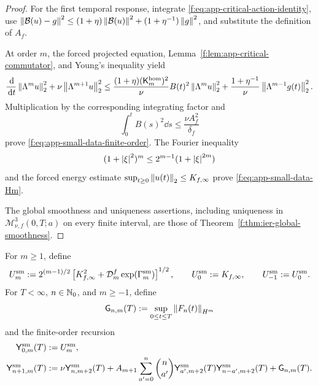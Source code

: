 \begin{proof}
For the first temporal response, integrate
\eqref{f:eq:app-critical-action-identity}, use
\(\left\lVert \mathcal B(u)-g\right\rVert^2\le
(1+\eta)\left\lVert \mathcal B(u)\right\rVert^2
+(1+\eta^{-1})\left\lVert g\right\rVert^2\), and substitute the definition of
\(A_f\).

At order \(m\), the forced projected equation,
Lemma~\ref{f:lem:app-critical-commutator}, and Young's inequality yield
\[
 \frac{\,\mathrm d}{\,\mathrm d t}\left\lVert \Lambda^mu\right\rVert_2^2
 +\nu\left\lVert \Lambda^{m+1}u\right\rVert_2^2
 \le
 \frac{(1+\eta)(\mathsf K_m^{\rm hom})^2}{\nu}
 B(t)^2\left\lVert \Lambda^mu\right\rVert_2^2
 +\frac{1+\eta^{-1}}{\nu}\left\lVert \Lambda^{m-1}g(t)\right\rVert_2^2.
\]
Multiplication by the corresponding integrating factor and
\[
 \int_0^tB(s)^2\dd s\le\frac{\nu A_f^2}{\delta_f}
\]
prove \eqref{f:eq:app-small-data-finite-order}.  The Fourier inequality
\[
 (1+\left|\xi\right|^2)^m\le2^{m-1}(1+\left|\xi\right|^{2m})
\]
and the forced energy estimate
\(\sup_{t\ge0}\left\lVert u(t)\right\rVert_2\le K_{f,\infty}\) prove
\eqref{f:eq:app-small-data-Hm}.

The global smoothness and uniqueness assertions, including uniqueness in
\(\mathscr M_{\nu,f}^3(0,T;a)\) on every finite interval, are those of
Theorem~\ref{f:thm:ier-global-smoothness}.
\end{proof}

For \(m\ge1\), define
\[
 U_m^{\rm sm}
 :=
 2^{(m-1)/2}
 \left[
 K_{f,\infty}^2+
 \mathcal D_m^f\exp(\Gamma_m^{\rm sm})
 \right]^{1/2},
 \qquad
 U_0^{\rm sm}:=K_{f,\infty},
 \qquad
 U_{-1}^{\rm sm}:=U_0^{\rm sm}.
\]
For \(T<\infty\), \(n\in\mathbb N_0\), and \(m\ge-1\), define
\[
 \mathsf G_{n,m}(T):=
 \sup_{0\le t\le T}\left\lVert F_n(t)\right\rVert_{H^m}
\]
and the finite-order recursion
\begin{align}
 \mathsf Y_{0,m}^{\rm sm}(T)&:=U_m^{\rm sm},
 \label{f:eq:app-small-Y0}\\
 \mathsf Y_{n+1,m}^{\rm sm}(T)
 &:=
 \nu\mathsf Y_{n,m+2}^{\rm sm}(T)
 +A_{m+1}\sum_{a'=0}^{n}\binom n{a'}
 \mathsf Y_{a',m+2}^{\rm sm}(T)
 \mathsf Y_{n-a',m+2}^{\rm sm}(T)
 +\mathsf G_{n,m}(T).
 \label{f:eq:app-small-Yrec}
\end{align}


